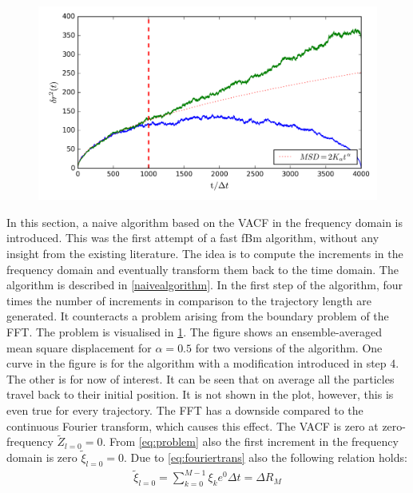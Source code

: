 \documentclass[
  a4paper,BCOR10mm,twoside,
  headsepline,footsepline,%
  fleqn,openbib
]{scrbook}
\begin{document}
\begin{figure}[h]
  \centering
  \includegraphics[width=\textwidth]{./data/nocorrectionmsd1.png}
  \captionsetup{width=\linewidth}
  \label{fig:41}
\end{figure}
In this section, a naive algorithm based on the VACF in the frequency domain is introduced. This was the first attempt of a fast fBm algorithm, without any insight from the existing literature. The idea is to compute the increments in the frequency domain and eventually transform them back to the time domain. The algorithm is described in \cref{naivealgorithm}. In the first step of the algorithm, four times the number of increments in comparison to the trajectory length are generated. It counteracts a problem arising from the boundary problem of the FFT. The problem is visualised in \cref{fig:41}. The figure shows an ensemble-averaged mean square displacement for $\alpha=0.5$ for two versions of the algorithm. One curve in the figure is for the algorithm with a modification introduced in step 4. The other is for now of interest. It can be seen that on average all the particles travel back to their initial position. It is not shown in the plot, however, this is even true for every trajectory. The FFT has a downside compared to the continuous Fourier transform, which causes this effect. The VACF is zero at zero-frequency $ \tilde{Z}_{l=0}=0$.  From \cref{eq:problem} also the first increment in the frequency domain is zero $ \tilde{\xi}_{l=0}=0$. Due to \cref{eq:fouriertrans} also the following relation holds:
 \begin{align}
   \tilde{\xi}_{l=0} = \sum_{k=0}^{M-1} \xi_k e^{0} \Delta t = \Delta  R_{M} \label{correction}
 \end{align}
\end{document}
